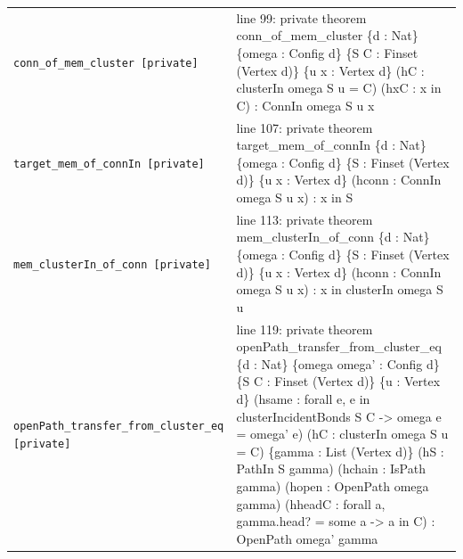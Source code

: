 \documentclass[10pt]{article}
\begin{document}
\begin{longtable}{>{\raggedright\arraybackslash}p{} >{\raggedright\arraybackslash}p{}}
\texttt{conn\_\allowbreak{}of\_\allowbreak{}mem\_\allowbreak{}cluster [private]} & {\ttfamily\scriptsize line 99:\allowbreak{} private theorem conn\_\allowbreak{}of\_\allowbreak{}mem\_\allowbreak{}cluster \{d :\allowbreak{} Nat\} \{omega :\allowbreak{} Config d\} \{S C :\allowbreak{} Finset (\allowbreak{}Vertex d)\allowbreak{}\} \{u x :\allowbreak{} Vertex d\} (\allowbreak{}hC :\allowbreak{} clusterIn omega S u =\allowbreak{} C)\allowbreak{} (\allowbreak{}hxC :\allowbreak{} x in C)\allowbreak{} :\allowbreak{} ConnIn omega S u x} \\[0.45em]
\texttt{target\_\allowbreak{}mem\_\allowbreak{}of\_\allowbreak{}connIn [private]} & {\ttfamily\scriptsize line 107:\allowbreak{} private theorem target\_\allowbreak{}mem\_\allowbreak{}of\_\allowbreak{}connIn \{d :\allowbreak{} Nat\} \{omega :\allowbreak{} Config d\} \{S :\allowbreak{} Finset (\allowbreak{}Vertex d)\allowbreak{}\} \{u x :\allowbreak{} Vertex d\} (\allowbreak{}hconn :\allowbreak{} ConnIn omega S u x)\allowbreak{} :\allowbreak{} x in S} \\[0.45em]
\texttt{mem\_\allowbreak{}clusterIn\_\allowbreak{}of\_\allowbreak{}conn [private]} & {\ttfamily\scriptsize line 113:\allowbreak{} private theorem mem\_\allowbreak{}clusterIn\_\allowbreak{}of\_\allowbreak{}conn \{d :\allowbreak{} Nat\} \{omega :\allowbreak{} Config d\} \{S :\allowbreak{} Finset (\allowbreak{}Vertex d)\allowbreak{}\} \{u x :\allowbreak{} Vertex d\} (\allowbreak{}hconn :\allowbreak{} ConnIn omega S u x)\allowbreak{} :\allowbreak{} x in clusterIn omega S u} \\[0.45em]
\texttt{openPath\_\allowbreak{}transfer\_\allowbreak{}from\_\allowbreak{}cluster\_\allowbreak{}eq [private]} & {\ttfamily\scriptsize line 119:\allowbreak{} private theorem openPath\_\allowbreak{}transfer\_\allowbreak{}from\_\allowbreak{}cluster\_\allowbreak{}eq \{d :\allowbreak{} Nat\} \{omega omega' :\allowbreak{} Config d\} \{S C :\allowbreak{} Finset (\allowbreak{}Vertex d)\allowbreak{}\} \{u :\allowbreak{} Vertex d\} (\allowbreak{}hsame :\allowbreak{} forall e,\allowbreak{} e in clusterIncidentBonds S C -\allowbreak{}> omega e =\allowbreak{} omega' e)\allowbreak{} (\allowbreak{}hC :\allowbreak{} clusterIn omega S u =\allowbreak{} C)\allowbreak{} \{gamma :\allowbreak{} List (\allowbreak{}Vertex d)\allowbreak{}\} (\allowbreak{}hS :\allowbreak{} PathIn S gamma)\allowbreak{} (\allowbreak{}hchain :\allowbreak{} IsPath gamma)\allowbreak{} (\allowbreak{}hopen :\allowbreak{} OpenPath omega gamma)\allowbreak{} (\allowbreak{}hheadC :\allowbreak{} forall a,\allowbreak{} gamma.\allowbreak{}head? =\allowbreak{} some a -\allowbreak{}> a in C)\allowbreak{} :\allowbreak{} OpenPath omega' gamma} \\[0.45em]

\end{longtable}
\end{document}
